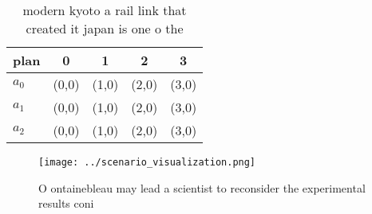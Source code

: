 \documentclass[a4paper]{article}
\begin{document}
\begin{table}
\begin{adjustbox}{width=0.5\columnwidth}
\begin{tabular}{|l|l|l|l|l|}
\hline
\textbf{plan} & \multicolumn{1}{c|}{\textbf{0}} & \multicolumn{1}{c|}{\textbf{1}} & \multicolumn{1}{c|}{\textbf{2}} & \multicolumn{1}{c|}{\textbf{3}} \\ \hline
\textbf{$a_0$}  & (0,0) & (1,0) & (2,0) & (3,0) \\ \hline
\textbf{$a_1$}  & (0,0) & (1,0) & (2,0) & (3,0) \\ \hline
\textbf{$a_2$}  & (0,0) & (1,0) & (2,0) & (3,0) \\ \hline
\end{tabular}
\end{adjustbox}
\caption{modern kyoto a rail link that created it japan is one o the
}
\end{table}

\begin{figure}
\centering
\texttt{[image: ../scenario\_visualization.png]}
\caption{O ontainebleau may lead a scientist to reconsider the experimental results coni
}
\end{figure}
 
\end{document}
